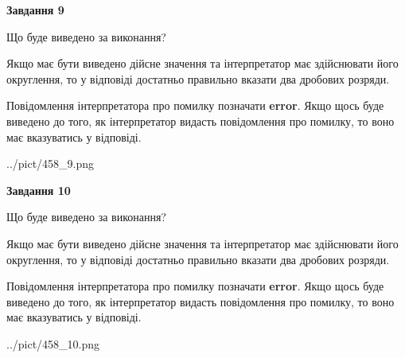 \documentclass[12pt, ukrainian]{article}
\begin{document}
{\begin {Large}
{\begin {center}\textbf{Завдання 9}\end {center}}\par
Що буде виведено за виконання? \par

Якщо має бути виведено дійсне значення та інтерпретатор має здійснювати його округлення, 
то у відповіді достатньо правильно вказати два дробових розряди.

Повідомлення інтерпретатора про помилку позначати \textbf{error}.
Якщо щось буде виведено до того, як інтерпретатор видасть повідомлення про помилку, 
то воно має вказуватись у відповіді. \par

\begin{center}
	{../pict/458_9.png}
\end{center}
\newpage

{\begin {center}\textbf{Завдання 10}\end {center}}\par
Що буде виведено за виконання? \par

Якщо має бути виведено дійсне значення та інтерпретатор має здійснювати його округлення, 
то у відповіді достатньо правильно вказати два дробових розряди.

Повідомлення інтерпретатора про помилку позначати \textbf{error}.
Якщо щось буде виведено до того, як інтерпретатор видасть повідомлення про помилку, 
то воно має вказуватись у відповіді. \par

\begin{center}
	{../pict/458_10.png}
\end{center}
\newpage

\end {Large}}
\end{document}
